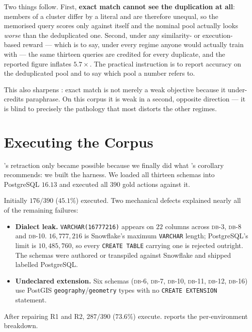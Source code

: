 \documentclass[11pt,letterpaper]{article}
\theoremstyle{definition}
\theoremstyle{plain}
\theoremstyle{remark}
\newcommand{\dbn}[1]{\textsc{db-#1}}
\newcommand{\code}[1]{\texttt{#1}}
\begin{document}
Two things follow. First, \textbf{exact match cannot see the duplication at all}:
members of a cluster differ by a literal and are therefore unequal, so the memorised
query scores only against itself and the nominal pool actually looks \emph{worse}
than the deduplicated one. Second, under any similarity- or execution-based reward
--- which is to say, under every regime anyone would actually train with --- the same
thirteen queries are credited for every duplicate, and the reported figure inflates
$5.7\times$. The practical instruction is to report accuracy on the deduplicated pool
and to say which pool a number refers to.

This also sharpens : exact match is not merely a weak objective
because it under-credits paraphrase. On this corpus it is weak in a second,
opposite direction --- it is blind to precisely the pathology that most distorts
the other regimes.

\section{Executing the Corpus}
\label{sec:execution}

's retraction only became possible because we finally did what
's corollary recommends: we built the harness. We loaded all thirteen schemas
into PostgreSQL $16.13$ and executed all $390$ gold actions against it.

Initially $176/390$ ($45.1\%$) executed. Two mechanical defects explained nearly all of the
remaining failures:

\begin{itemize}[leftmargin=1.5em,itemsep=2pt,topsep=3pt]
  \item[\textbf{R1}] \textbf{Dialect leak.} \code{VARCHAR(16777216)} appears on $22$ columns
        across \dbn{3}, \dbn{8} and \dbn{10}. $16{,}777{,}216$ is Snowflake's maximum
        \code{VARCHAR} length; PostgreSQL's limit is $10{,}485{,}760$, so every
        \code{CREATE TABLE} carrying one is rejected outright. The schemas were authored or
        transpiled against Snowflake and shipped labelled PostgreSQL.
  \item[\textbf{R2}] \textbf{Undeclared extension.} Six schemas (\dbn{6}, \dbn{7}, \dbn{10},
        \dbn{11}, \dbn{12}, \dbn{16}) use PostGIS \code{geography}/\code{geometry} types with
        no \code{CREATE EXTENSION} statement.
\end{itemize}

After repairing R1 and R2, $287/390$ ($73.6\%$) execute.  reports the
per-environment breakdown.
\end{document}
